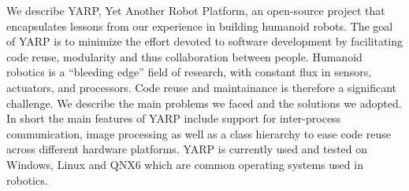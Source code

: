 
We describe YARP, Yet Another Robot Platform, an open-source project
that encapsulates lessons from our experience in building humanoid
robots.  The goal of YARP is to minimize the effort
devoted to software development by facilitating code reuse, 
modularity and thus collaboration between people. Humanoid robotics is a ``bleeding edge'' field of research, with constant flux in sensors, actuators, and 
processors.  Code reuse and maintainance is therefore a significant 
challenge. We describe the main problems we faced and the 
solutions we adopted. 
In short the main features of YARP include support for inter-process
communication, image processing as well as a class hierarchy
to ease code reuse across different hardware platforms. YARP
is currently used and tested on Windows, Linux and QNX6 which are common 
operating systems used in robotics. 

